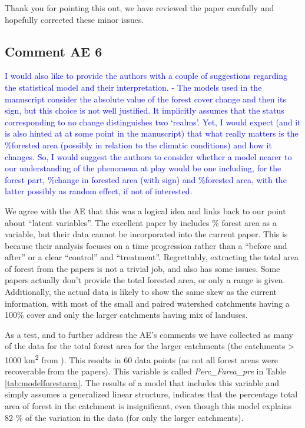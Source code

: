 \documentclass[]{elsarticle} %
\begin{document}
Thank you for pointing this out, we have reviewed the paper carefully and hopefully corrected these minor issues.

\hypertarget{comment-ae-6}{%
\subsection{Comment AE 6}\label{comment-ae-6}}

\textcolor{blue}{I would also like to provide the authors with a couple of suggestions regarding the statistical model and their interpretation. 
- The models used in the manuscript consider the absolute value of the forest cover change and then its sign, but this choice is not well justified. It implicitly assumes that the status corresponding to no change distinguishes two ‘realms’. Yet, I would expect (and it is also hinted at at some point in the manuscript) that what really matters is the \%forested area (possibly in relation to the climatic conditions) and how it changes. So, I would suggest the authors to consider whether a model nearer to our understanding of the phenomena at play would be one including, for the forest part, \%change in forested area (with sign) and \%forested area, with the latter possibly as random effect, if not of interested.}

We agree with the AE that this was a logical idea and links back to our point about ``latent variables''. The excellent paper by \citet{levy2018} includes \% forest area as a variable, but their data cannot be incorporated into the current paper. This is because their analysis focuses on a time progression rather than a ``before and after'' or a clear ``control'' and ``treatment''.
Regrettably, extracting the total area of forest from the papers is not a trivial job, and also has some issues. Some papers actually don't provide the total forested area, or only a range is given. Additionally, the actual data is likely to show the same skew as the current information, with most of the small and paired watershed catchments having a 100\% cover and only the larger catchments having mix of landuses.

As a test, and to further address the AE's comments we have collected as many of the data for the total forest area for the larger catchments (the catchments \textgreater{} 1000 km\textsuperscript{2} from \citet{zhang2017}). This results in 60 data points (as not all forest areas were recoverable from the papers). This variable is called \emph{Perc\_Farea\_pre} in Table \ref{tab:modelforestarea}. The results of a model that includes this variable and simply assumes a generalized linear structure, indicates that the percentage total area of forest in the catchment is insignificant, even though this model explains 82 \% of the variation in the data (for only the larger catchments).
\end{document}
